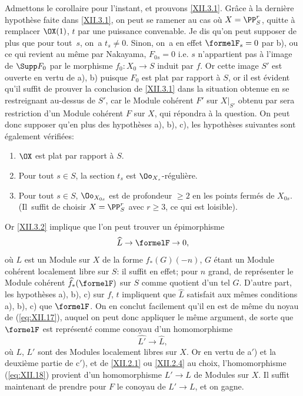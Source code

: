 Admettons le corollaire pour l'instant, et prouvons \ref{XII.3.1}. Gr\^ace \`a la derni\`ere hypoth\`ese faite dans \ref{XII.3.1}, on peut se ramener au cas o\`u $X=\PP^r_S$, quitte \`a remplacer $\OX(1)$, $t$ par une puissance convenable. Je dis qu'on peut supposer de plus que pour tout~$s$, on~a $t_s\neq 0$. Sinon, on~a en effet $\formelF_s=0$ par b), ou ce qui revient au m\^eme par Nakayama, $F_{0s}=0$ i.e. $s$ n'appartient pas \`a l'image de $\Supp F_0$ par le morphisme $f_0:X_0\to S$ induit par $f$. Or cette image $S'$ est ouverte en vertu de a), b) puisque $F_0$ est plat par rapport \`a $S$, or il est \'evident qu'il suffit de prouver la conclusion de \ref{XII.3.1} dans la situation obtenue en se restreignant au-dessus de $S'$, car le Module coh\'erent $F'$ sur $X|_{S'}$ obtenu par sera restriction d'un Module coh\'erent $F$ sur $X$, qui r\'epondra \`a la question. On peut donc supposer qu'en plus des hypoth\`eses a), b), c), les hypoth\`eses suivantes sont \'egalement v\'erifi\'ees:
\begin{enumerate}
\item[\textup{a$'$)}] $\OX$ est plat par rapport \`a $S$.
\item[\textup{b$'$)}] Pour tout $s\in S$, la section $t_s$ est $\Oo_{X_s}$-r\'eguli\`ere.
\item[\textup{c$'$)}] Pour tout $s\in S$, $\Oo_{X_{0s}}$ est de profondeur $\geq 2$ en les points ferm\'es de $X_{0s}$. (Il~suffit de choisir $X=\PP_S^r$ avec $r\geq 3$, ce qui est loisible).
\end{enumerate}
Or \ref{XII.3.2} implique que l'on peut trouver un \'epimorphisme
\steco
\begin{equation} \label{eq:XII.17}
\widehat{L} \to \formelF \to 0,
\end{equation}
o\`u $L$ est un Module sur $X$ de la forme $f_\ast(G)(-n)$, $G$ \'etant un Module coh\'erent localement libre sur $S$: il suffit en effet; pour $n$ grand, de repr\'esenter le Module coh\'erent $\widehat{f}_\ast(\formelF)$ sur $S$ comme quotient d'un tel $G$. D'autre part, les hypoth\`eses a), b), c) sur $f$, $t$ impliquent que $\widehat{L}$ satisfait aux m\^emes conditions a), b), c) que $\formelF$. On en conclut facilement qu'il en est de m\^eme du noyau de (\ref{eq:XII.17}), auquel on peut donc appliquer le m\^eme argument, de sorte que $\formelF$ est repr\'esent\'e comme conoyau d'un homomorphisme
\steco
\begin{equation} \label{eq:XII.18}
\widehat{L'} \to \widehat{L},
\end{equation}
o\`u $L$, $L'$ sont des Modules localement libres sur $X$. Or en vertu de a$'$) et la deuxi\`eme partie de c$'$), et de \ref{XII.2.1} ou \ref{XII.2.4} au choix, l'homomorphisme (\ref{eq:XII.18}) provient d'un homomorphisme $L'\to L$ de Modules sur $X$. Il suffit maintenant de prendre pour $F$ le conoyau de $L'\to L$, et on gagne.

